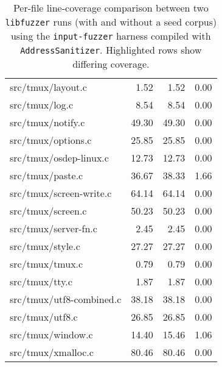 \begin{table*}[!tb]
\begin{tabular}{@{}lrrr@{}}
		src/tmux/layout.c                   & 1.52  & 1.52  & 0.00 \\
		src/tmux/log.c                      & 8.54  & 8.54  & 0.00 \\
		src/tmux/notify.c                   & 49.30 & 49.30 & 0.00 \\
		src/tmux/options.c                  & 25.85 & 25.85 & 0.00 \\
		src/tmux/osdep-linux.c              & 12.73 & 12.73 & 0.00 \\
		\rowcolor{yellow} src/tmux/paste.c  & 36.67 & 38.33 & 1.66 \\
		src/tmux/screen-write.c             & 64.14 & 64.14 & 0.00 \\
		src/tmux/screen.c                   & 50.23 & 50.23 & 0.00 \\
		src/tmux/server-fn.c                & 2.45  & 2.45  & 0.00 \\
		src/tmux/style.c                    & 27.27 & 27.27 & 0.00 \\
		src/tmux/tmux.c                     & 0.79  & 0.79  & 0.00 \\
		src/tmux/tty.c                      & 1.87  & 1.87  & 0.00 \\
		src/tmux/utf8-combined.c            & 38.18 & 38.18 & 0.00 \\
		src/tmux/utf8.c                     & 26.85 & 26.85 & 0.00 \\
		\rowcolor{yellow} src/tmux/window.c & 14.40 & 15.46 & 1.06 \\
		src/tmux/xmalloc.c                  & 80.46 & 80.46 & 0.00 \\
		\bottomrule
	\end{tabular}

	\caption{Per-file line-coverage comparison between two \texttt{libfuzzer} runs (with and without a seed corpus) using the \texttt{input-fuzzer} harness compiled with \texttt{AddressSanitizer}.  Highlighted rows show differing coverage.}
	\label{tbl:coverage-comparison}
\end{table*}

